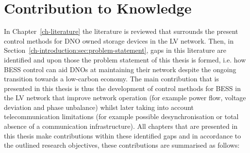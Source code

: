 \section{Contribution to Knowledge}
\label{ch-conclusions:sec:knowledge-contribution}

In Chapter~\ref{ch-literature} the literature is reviewed that surrounds the present control methods for DNO owned storage devices in the LV network.
Then, in Section~\ref{ch-introduction:sec:problem-statement}, gaps in this literature are identified and upon those the problem statement of this thesis is formed, i.e. how BESS control can aid DNOs at maintaining their network despite the ongoing transition towards a low-carbon economy.
The main contribution that is presented in this thesis is thus the development of control methods for BESS in the LV network that improve network operation (for example power flow, voltage deviation and phase unbalance) whilst later taking into account telecommunication limitations (for example possible desynchronisation or total absence of a communication infrastructure).
All chapters that are presented in this thesis make contributions within these identified gaps and in accordance to the outlined research objectives, these contributions are summarised as follows:

